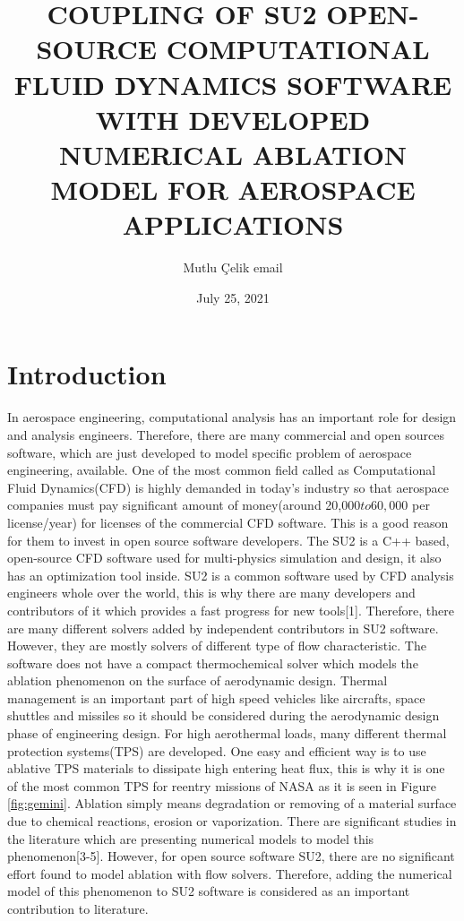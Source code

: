 \documentclass[12pt]{article}
\title{COUPLING OF SU2 OPEN-SOURCE COMPUTATIONAL FLUID DYNAMICS SOFTWARE WITH DEVELOPED NUMERICAL ABLATION MODEL FOR AEROSPACE APPLICATIONS}
\author{Mutlu Çelik  email}
\date{July 25, 2021}
\begin{document}
\maketitle

\section{Introduction} In aerospace engineering, computational analysis has an important role for design and analysis engineers. Therefore, there are many commercial and open sources software, which are just developed to model specific problem of aerospace engineering, available. One of the most common field called as Computational Fluid Dynamics(CFD) is highly demanded in today’s industry so that aerospace companies must pay significant amount of money(around 20,000$ to 60,000$ per license/year) for licenses of the commercial CFD software. This is a good reason for them to invest in open source software developers. 
The SU2 is a C++ based, open-source CFD software used for multi-physics simulation and design, it also has an optimization tool inside. SU2 is a common software used by CFD analysis engineers whole over the world, this is why there are many developers and contributors of it which provides a fast progress for new tools[1]. Therefore, there are many different solvers added by independent contributors in SU2 software. However, they are mostly solvers of different type of flow characteristic. The software does not have a compact thermochemical solver which models the ablation phenomenon on the surface of aerodynamic design. \newline
Thermal management is an important part of high speed vehicles like aircrafts, space shuttles and missiles so it should be considered during the aerodynamic design phase of engineering design. For high aerothermal loads, many different thermal protection systems(TPS) are developed. One easy and efficient way is to use ablative TPS materials to dissipate high entering heat flux, this is why it is one of the most common TPS for reentry missions of NASA as it is seen in Figure \ref{fig:gemini}.  Ablation simply means degradation or removing of a material surface due to chemical reactions, erosion or vaporization. There are significant studies in the literature which are presenting numerical models to model this phenomenon[3-5]. However, for open source software SU2, there are no significant effort found to model ablation with flow solvers. Therefore, adding the numerical model of this phenomenon to SU2 software is considered as an important contribution to literature. \newline
\end{document}
